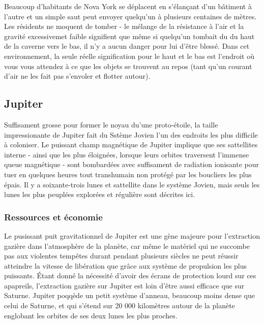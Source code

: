 Beaucoup d'habitants de Nova York se déplacent en s'élançant d'un bâtiment à l'autre et un simple saut peut envoyer quelqu'un à plusieurs centaines de mètres. Les résidents ne moquent de tomber - le mélange de la résistance à l'air et la gravité excessivemet faible signifient que même si quelqu'un tombait du du haut de la caverne vers le bas, il n'y a aucun danger pour lui d'être blessé. Dans cet environnement, la seule réelle signification pour le haut et le bas est l'endroit où vous vous attendez à ce que les objets se trouvent au repos (tant qu'un courant d'air ne les fait pas s'envoler et flotter autour). 

\subsection{Jupiter} \label{sec:jupiter} 

Suffisament grosse pour former le noyau du'une proto-étoile, la taille impressionante de Jupiter fait du Sstème Jovien l'un des endroits les plus difficile à coloniser. Le puissant champ magnétique de Jupiter implique que ses sattellites interne - ainsi que les plus éloignées, lorsque leurs orbites traversent l'immense queue magnétique - sont bombardées avec suffisament de radiation ionisante pour tuer en quelques heures tout transhumain non protégé par les boucliers les plus épais. Il y a soixante-trois lunes et sattellite dans le système Jovien, mais seuls les lunes les plus peuplées explorées et régulière sont décrites ici. 

\subsubsection{Ressources et économie} \label{sec:jupiter-resources-economy} 

Le pusissant puit gravitationnel de Jupiter est une gène majeure pour l'extraction gazière dans l'atmosphère de la planète, car même le matériel qui ne succombe pas aux violentes tempêtes durant pendant plusieurs siècles ne peut réussir atteindre la vitesse de libération que grâce aux système de propulsion les plus puissants. Étant donné la nécessité d'avoir des écrans de protection lourd sur ces apapreils, l'extraction gazière sur Jupiter est loin d'être aussi efficace que sur Saturne. Jupiter poqqède un petit système d'anneau, beaucoup moins dense que celui de Saturne, et qui s'étend sur 20 000 kilomètres autour de la planète englobant les orbites de ses deux lunes les plus proches. 

